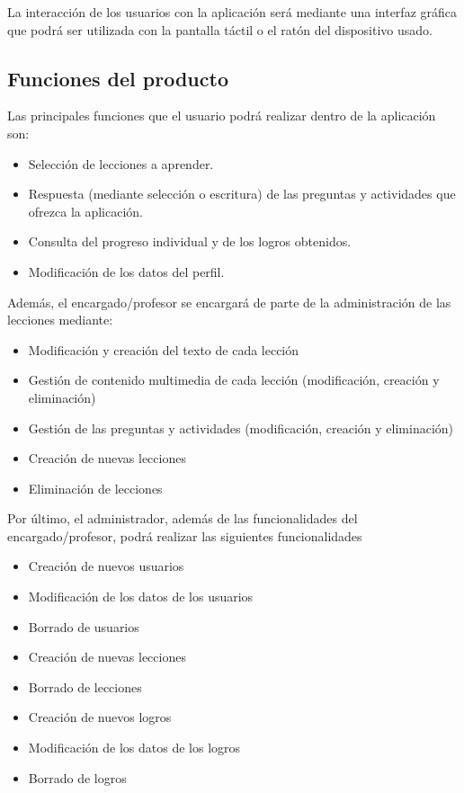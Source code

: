 La interacción de los usuarios con la aplicación será mediante una interfaz gráfica que podrá ser utilizada con la pantalla táctil o el ratón del dispositivo usado.


\subsection{Funciones del producto}
Las principales funciones que el usuario podrá realizar dentro de la aplicación son:
\begin{itemize}
\item Selección de lecciones a aprender.
\item Respuesta (mediante selección o escritura) de las preguntas y actividades que ofrezca la aplicación.
\item Consulta del progreso individual y de los logros obtenidos.
\item Modificación de los datos del perfil.
\end {itemize}

Además, el encargado/profesor se encargará de parte de la administración de las lecciones mediante:
\begin{itemize}
    \item Modificación y creación del texto de cada lección
    \item Gestión de contenido multimedia de cada lección (modificación, creación y eliminación)
    \item Gestión de las preguntas y actividades (modificación, creación y eliminación)
    \item Creación de nuevas lecciones
    \item Eliminación de lecciones
\end{itemize}

Por último, el administrador, además de las funcionalidades del encargado/profesor, podrá realizar las siguientes funcionalidades
\begin{itemize}
    \item Creación de nuevos usuarios
    \item Modificación de los datos de los usuarios
    \item Borrado de usuarios
    \item Creación de nuevas lecciones
    \item Borrado de lecciones
    \item Creación de nuevos logros
    \item Modificación de los datos de los logros
    \item Borrado de logros
\end{itemize}

